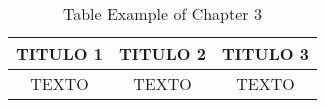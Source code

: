 %

\begin{table}[H]
    \centering
    \begin{tabular}{|c|c|c|}
        \hline
        \textbf{TITULO 1} & \textbf{TITULO 2} & \textbf{TITULO 3} \\ \hline
        TEXTO             & TEXTO             & TEXTO             \\ \hline
    \end{tabular}
    \caption{Table Example of Chapter 3}
    \label{C3T1:tableExample}
\end{table}